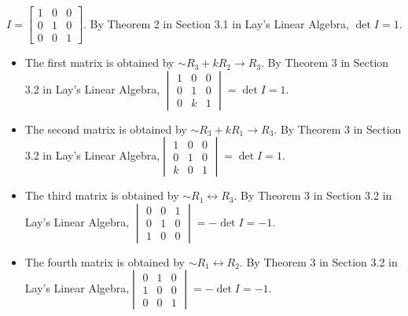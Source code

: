 \documentclass[11pt]{scrartcl}
\theoremstyle{dotlessP}
\theoremstyle{dotlessN}
\begin{document}
$I = 
\begin{bmatrix}
	1 & 0 & 0 \\
	0 & 1 & 0 \\
	0 & 0 & 1 
\end{bmatrix}
$. By Theorem 2 in Section 3.1 in Lay's Linear Algebra, $\det I = 1$.
\begin{itemize}
	\item The first matrix is obtained by $\sim R_3 + kR_2 \to R_3$. By Theorem 3 in Section 3.2 in Lay's Linear Algebra, $
\begin{vmatrix}
	
		1 & 0 & 0 \\
		0 & 1 & 0 \\
		0 & k & 1
\end{vmatrix} = \det I = 1$.
\item The second matrix is obtained by $\sim R_3 + kR_1 \to R_3$. By Theorem 3 in Section 3.2 in Lay's Linear Algebra,$
\begin{vmatrix}
	
		1 & 0 & 0 \\
		0 & 1 & 0 \\
		k & 0 & 1
\end{vmatrix} = \det I = 1$.
\item The third matrix is obtained by $\sim R_1 \leftrightarrow R_3$. By Theorem 3 in Section 3.2 in Lay's Linear Algebra,
$	\begin{vmatrix}
		0 & 0 & 1 \\
		0 & 1 & 0 \\
		1 & 0 & 0
	\end{vmatrix} = - \det I = -1$.
\item The fourth matrix is obtained by $\sim R_1 \leftrightarrow R_2$. By Theorem 3 in Section 3.2 in Lay's Linear Algebra,$
	\begin{vmatrix}
		0 & 1 & 0 \\
		1 & 0 & 0 \\
		0 & 0 & 1
	\end{vmatrix} = - \det I = -1$.
\end{itemize}
\end{document}
